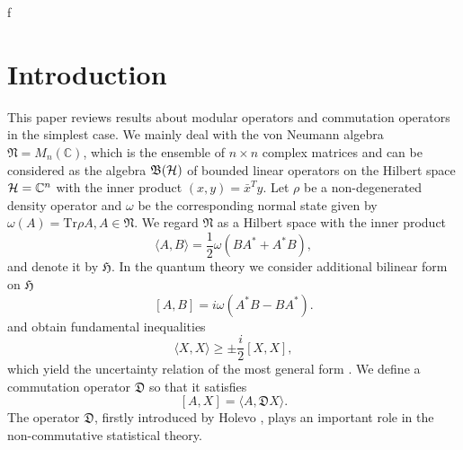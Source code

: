 f\section{Introduction}
This paper reviews results about  modular operators \cite{Longo_1978} and  commutation operators \cite{Holevo_1977} in the simplest case.
We mainly deal with the von Neumann algebra $\mathfrak{N}=M_n(\mathbb{C})$, 
which is the ensemble of $n\times n$ complex matrices and can be considered as the algebra $\mathfrak{B}({\cal H})$ of bounded linear operators on 
the Hilbert space ${\cal H}=\mathbb{C}^{n}$ with the inner product $(x,y)=\bar{x}^Ty$. 
Let $\rho$ be a non-degenerated density operator and 
$\omega$ be the corresponding normal state given by $\omega(A)=\mbox{Tr}\rho A, A\in \mathfrak{N}$.
We regard $\mathfrak{N}$ as a Hilbert space with the inner product
\begin{equation}
\label{innerP}
\langle A, B \rangle =\frac{1}{2}\omega(BA^{\ast}+A^{\ast}B),
\end{equation}
and denote it by $\mathfrak{H}$.
In the quantum theory we consider additional bilinear form on $\mathfrak{H}$ 
\begin{equation}\label{Bform}
[A,B]=i\omega(A^{\ast}B-BA^{\ast}).
\end{equation}
and  obtain fundamental inequalities 
$$
\langle X, X\rangle \geq \pm \frac{i}{2}[X,X],
$$
which yield  the uncertainty relation of the most general form \cite{Holevo_1977}.
We define a commutation operator $\mathfrak{D}$ so that it satisfies 
\begin{equation}\label{Copr}
[A,X]=\langle A, \mathfrak{D}X\rangle.
\end{equation}
The operator $\mathfrak{D}$, firstly introduced by Holevo \cite{Holevo_1977}, plays an important role in the non-commutative statistical theory.  

